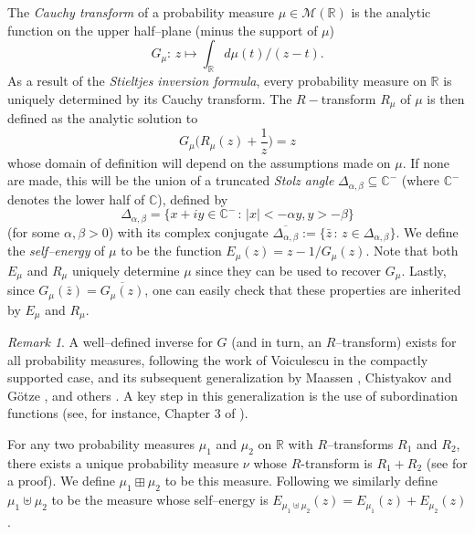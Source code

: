 \documentclass{amsart}
\theoremstyle{definition}
\theoremstyle{remark}
\newtheorem{remark}[theorem]{Remark}
\numberwithin{equation}{section}
\begin{document}
The \textit{Cauchy transform} of a probability measure $\mu\in\mathcal{M}(\mathbb{R})$ is the analytic function on the upper half--plane (minus the support of $\mu$)
\[
    G_\mu:\,z\mapsto\int_\mathbb{R}d\mu(t)/(z-t).
\]
As a result of the \textit{Stieltjes inversion formula}, every probability measure on $\mathbb{R}$ is uniquely determined by its Cauchy transform. The $R-$transform $R_{\mu}$ of $\mu$ is then defined as the analytic solution to 
\begin{equation}\label{Rtransf}
     G_\mu\Big(R_\mu(z)+\frac{1}{z}\Big)=z
\end{equation}
whose domain of definition will depend on the assumptions made on $\mu$. If none are made, this will be the union of a truncated \textit{Stolz angle }$\Delta_{\alpha,\beta}\subseteq \mathbb{C}^{-}$ {(where $\mathbb{C}^{-}$ denotes the lower half of $\mathbb{C}$)}, defined by
\[
    \Delta_{\alpha,\beta} = \{x+iy\in\mathbb{C}^{-}\,:\, |x|< -\alpha y, y>-\beta\}
\]
(for some $\alpha,\beta>0$) with its complex conjugate $\overline{\Delta_{\alpha,\beta}}:=\{\bar{z}\,:\,z\in \Delta_{\alpha,\beta}\}$.
We define the \textit{self--energy} of $\mu$ to be the function $E_\mu(z)=z-1/G_\mu(z)$. Note that both $E_\mu$ and $R_\mu$ uniquely determine $\mu$ since they can be used to recover $G_\mu$. Lastly, since $G_\mu(\bar{z})=\overline{G_\mu(z)}$, one can easily check that these properties are inherited by $E_\mu$ and $R_\mu$. 

\begin{remark}
A well--defined inverse for $G$ (and in turn, an $R$--transform) exists for all probability measures, following the work of Voiculescu \cite{VoiculescuRTransform} in the compactly supported case, and its subsequent generalization by Maassen \cite{Maassen}, Chistyakov and G{\"o}tze \cite{ChistyakovGotze1,ChistyakovGotze2}, and others \cite{BercoviciVoiculescu,BelinschiBercovici}. 
A key step in this generalization is the use of subordination functions (see, for instance, Chapter 3 of \cite{MingoSpeicher}). 
\end{remark}

For any two probability measures $\mu_1$ and $\mu_2$ on $\mathbb{R}$ with $R$--transforms $R_1$ and $R_2$, there exists a unique probability  measure $\nu$ whose $R$-transform is $R_1+R_2$ (see \cite{MingoSpeicher} for a proof). We define $\mu_1\boxplus \mu_2$ to be this measure. Following \cite{SpeicherWoroudi} we similarly define $\mu_1\uplus \mu_2$ to be the measure whose self--energy is $E_{\mu_1\uplus \mu_2}(z)=E_{\mu_1}(z)+E_{\mu_2}(z)$. 
\end{document}
